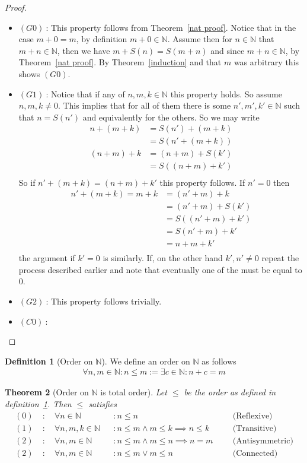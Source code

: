 \documentclass[a4paper,11pt]{article}
\theoremstyle{plain}
\newtheorem{theorem}{Theorem}
\theoremstyle{definition}
\newtheorem{definition}[theorem]{Definition}
\newcommand{\N}{\mathbb{N}}
\begin{document}
\begin{proof}\
\begin{itemize}
	\item[] $(G0)\ $: This property follows from Theorem~\ref{nat
		proof}. Notice that in the case $m+0=m$, by definition
		$m+0\in\N$. Assume then for $n\in\N$ that $m+n\in\N$,
		then we have $m+S(n)=S(m+n)$ and since $m+n\in\N$,
		by Theorem~\ref{nat proof}. By Theorem~\ref{induction}
		and that $m$ was arbitrary this shows $(G0)$.
	\item[] $(G1)\ $: Notice that if any of $n,m,k\in\N$ this 
		property holds. So assume $n,m,k\neq 0$. This implies that
		for all of them there is some $n',m',k'\in\N$ such that
		$n=S(n')$ and equivalently for the others. So we may write
		\begin{align*}
			n+(m+k) &= S(n')+(m+k)\\
					&= S(n'+(m+k))\\
			(n+m)+k &= (n+m)+S(k')\\
					&= S((n+m)+k')\\
		\end{align*}
		So if $n'+(m+k)=(n+m)+k'$ this property follows. If
		$n'=0$ then
		\begin{align*}
			n'+(m+k)=m+k&=(n'+m)+k\\
						&=(n'+m)+S(k')\\
						&=S((n'+m)+k')\\
						&=S(n'+m)+k'\\
						&=n+m+k'\\
		\end{align*}
		the argument if $k'=0$ is similarly. If, on the other
		hand $k',n'\neq0$ repeat the process described earlier
		and note that eventually one of the must be equal to $0$.
	\item[] $(G2)\ $: This property follows trivially.
	\item[] $(C0)\ $:
\end{itemize}
\end{proof}
\begin{definition}[Order on $\N$]\label{order}
	We define an order on $\N$ as follows
	\begin{align*}
		\forall n,m\in\N:n\leq m:= \exists c\in\N:n+c=m
	\end{align*}
\end{definition}
\begin{theorem}[Order on $\N$ is total order]\label{well-ordered}
	Let $\leq$ be the order as defined in definition~\ref{order}. Then $\leq$
	satisfies
	\begin{align*}
		(0)\; &:\quad \forall n\in\N &&: n\leq n
		&&&\text{(Reflexive)}\\
		(1)\; &:\quad \forall n,m,k\in\N&&:n\leq m\land m\leq k\implies n\leq k
		&&&\text{(Transitive)}\\
		(2)\; &:\quad \forall n,m\in\N &&:n\leq m\land m\leq n \implies n=m
		&&&\text{(Antisymmetric)}\\
		(2)\; &:\quad \forall n,m\in\N &&:n\leq m\lor m\leq n
		&&&\text{(Connected)}\\
	\end{align*}
\end{theorem}
\end{document}
